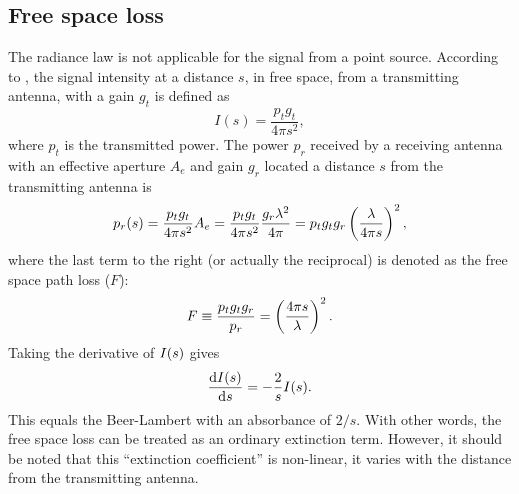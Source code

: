 \subsection{Free space loss}
\label{sec:radiolinks:ppath}
The radiance law is not applicable for the signal from a point source.
According to \citet{ippolito:satco:08}, the signal intensity at a distance
\(s\), in free space, from a transmitting antenna, with a gain \(g_{t}\) is
defined as
\begin{equation}
 I(s)=\frac{p_{t}g_{t}}{4\pi s^{2}},
\end{equation}
where \(p_{t}\) is the transmitted power. The power \(p_{r}\) received by a
receiving antenna with an effective aperture \(A_{e}\) and gain \(g_{r}\)
located a distance \(s\) from the transmitting antenna is
\begin{equation}
\label{eq:fsl}
p_{r}(s)=\frac{p_{t}g_{t}}{4\pi s^{2}}A_{e}=\frac{p_{t}g_{t}}{4\pi s^{2}}
\frac{g_{r}\lambda^{2}}{4\pi}=
p_{t}g_{t}g_{r}\left(\frac{\lambda}{4\pi s} \right)^{2},
\end{equation}
where the last term  
to the right (or actually the reciprocal) is denoted as the
free space path loss (\(F\)):
\begin{equation}
F\equiv\frac{p_{t}g_{t}g_{r}}{p_{r}}=\left(\frac{4\pi s}{\lambda}\right)^{2}.
\end{equation}
Taking the derivative of \(I(s)\) gives
\begin{equation}
\label{eq:fsplarts}
 \frac{\mathrm{d}I(s)}{\mathrm{d} s}=-\frac{2}{s}I(s).
\end{equation}
This equals the Beer-Lambert with an absorbance of $2/s$. With other words, the
free space loss can be treated as an ordinary extinction term. However, it
should be noted that this ``extinction coefficient'' is non-linear, it varies
with the distance from the transmitting antenna. 


